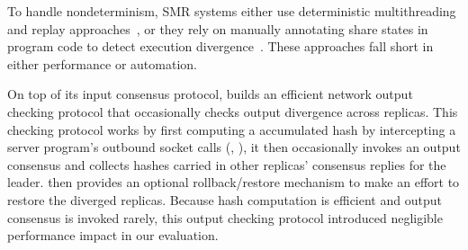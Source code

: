 To handle nondeterminism, SMR systems either use deterministic multithreading 
and replay approaches~\cite{rex:eurosys14,crane:sosp15,ddos:asplos13}, or they 
rely on manually annotating share states in program code to detect execution 
divergence~\cite{eve:osdi12}. These approaches fall short in either performance 
or automation.

On top of its input consensus protocol, \xxx builds an efficient network output 
checking protocol that occasionally checks output divergence across replicas. 
This checking protocol works by first computing a accumulated hash by 
intercepting a server program's outbound socket calls (\eg, \send), it then 
occasionally invokes an output consensus and collects hashes carried in other 
replicas' consensus replies for the leader. \xxx then provides an optional 
rollback/restore mechanism to make an effort to restore the diverged replicas. 
Because hash computation is efficient and output consensus is invoked rarely, 
this output checking protocol introduced negligible performance impact in our 
evaluation.


% 




